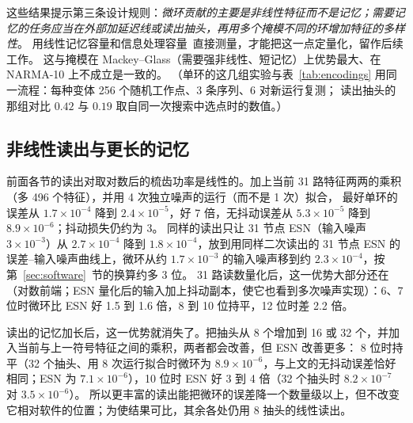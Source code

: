 这些结果提示第三条设计规则：\emph{微环贡献的主要是非线性特征而不是记忆；需要记忆的任务应当在外部加延迟线或读出抽头，再用多个掩模不同的环增加特征的多样性}。
用线性记忆容量和信息处理容量~\cite{dambre2012}直接测量，才能把这一点定量化，留作后续工作。
这与掩模在 Mackey--Glass（需要强非线性、短记忆）上优势最大、在 NARMA-10 上不成立是一致的。
（单环的这几组实验与表~\ref{tab:encodings} 用同一流程：每种变体 256 个随机工作点、3 条序列、6 对新运行复测；
读出抽头的那组对比 $0.42$ 与 $0.19$ 取自同一次搜索中选点时的数值。）

\subsection{非线性读出与更长的记忆}\label{sec:nonlin-readout}

前面各节的读出对取对数后的梳齿功率是线性的。加上当前 31 路特征两两的乘积（多 496 个特征），并用 4 次独立噪声的运行（而不是 1 次）拟合，
最好单环的误差从 $1.7\times10^{-4}$ 降到 $2.4\times10^{-5}$，好 7 倍，无抖动误差从 $5.3\times10^{-5}$ 降到 $8.9\times10^{-6}$；抖动损失仍约为 3。
同样的读出只让 31 节点 ESN（输入噪声 $3\times10^{-3}$）从 $2.7\times10^{-4}$ 降到 $1.8\times10^{-4}$，放到用同样二次读出的 31 节点 ESN 的误差--输入噪声曲线上，微环从约 $1.7\times10^{-3}$ 的输入噪声移到约 $2.3\times10^{-4}$，按第~\ref{sec:software}~节的换算约多 3 位。
31 路读数量化后，这一优势大部分还在（对数前端；ESN 量化后的输入加上抖动副本，使它也看到多次噪声实现）：6、7 位时微环比 ESN 好 1.5 到 1.6 倍，8 到 10 位持平，12 位时差 2.2 倍。

读出的记忆加长后，这一优势就消失了。把抽头从 8 个增加到 16 或 32 个，并加入当前与上一符号特征之间的乘积，两者都会改善，但 ESN 改善更多：
8 位时持平（32 个抽头、用 8 次运行拟合时微环为 $8.9\times10^{-6}$，与上文的无抖动误差恰好相同；ESN 为 $7.1\times10^{-6}$），10 位时 ESN 好 3 到 4 倍（32 个抽头时 $8.2\times10^{-7}$ 对 $3.5\times10^{-6}$）。
所以更丰富的读出能把微环的误差降一个数量级以上，但不改变它相对软件的位置；为使结果可比，其余各处仍用 8 抽头的线性读出。
